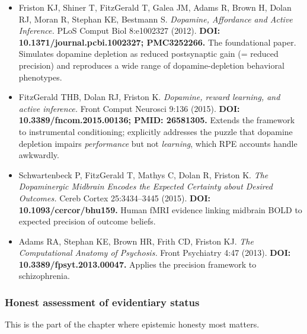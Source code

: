 \begin{itemize}
\tightlist
\item
  Friston KJ, Shiner T, FitzGerald T, Galea JM, Adams R, Brown H, Dolan RJ, Moran R, Stephan KE, Bestmann S. \emph{Dopamine, Affordance and Active Inference.} PLoS Comput Biol 8:e1002327 (2012). \textbf{DOI: 10.1371/journal.pcbi.1002327; PMC3252266.} The foundational paper. Simulates dopamine depletion as reduced postsynaptic gain (= reduced precision) and reproduces a wide range of dopamine-depletion behavioral phenotypes.
\item
  FitzGerald THB, Dolan RJ, Friston K. \emph{Dopamine, reward learning, and active inference.} Front Comput Neurosci 9:136 (2015). \textbf{DOI: 10.3389/fncom.2015.00136; PMID: 26581305.} Extends the framework to instrumental conditioning; explicitly addresses the puzzle that dopamine depletion impairs \emph{performance} but not \emph{learning}, which RPE accounts handle awkwardly.
\item
  Schwartenbeck P, FitzGerald T, Mathys C, Dolan R, Friston K. \emph{The Dopaminergic Midbrain Encodes the Expected Certainty about Desired Outcomes.} Cereb Cortex 25:3434--3445 (2015). \textbf{DOI: 10.1093/cercor/bhu159.} Human fMRI evidence linking midbrain BOLD to expected precision of outcome beliefs.
\item
  Adams RA, Stephan KE, Brown HR, Frith CD, Friston KJ. \emph{The Computational Anatomy of Psychosis.} Front Psychiatry 4:47 (2013). \textbf{DOI: 10.3389/fpsyt.2013.00047.} Applies the precision framework to schizophrenia.
\end{itemize}

\subsubsection{Honest assessment of evidentiary status}\label{01_dopamine_substrate-honest-assessment-of-evidentiary-status}

This is the part of the chapter where epistemic honesty most matters.

